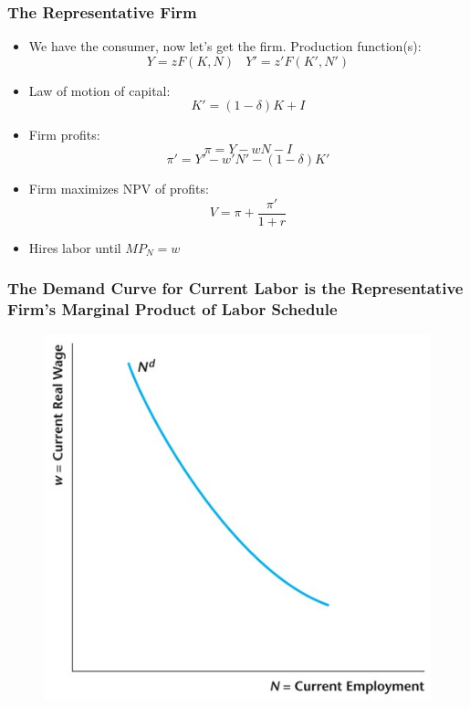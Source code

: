 \documentclass{beamer}
\begin{document}
\begin{frame}
\frametitle[alignment=center]{The Representative Firm}
\begin{itemize}
\item We have the consumer, now let's get the firm.  Production function(s):
$$Y=zF(K,N)\ \ \ \ Y'=z'F(K',N')$$
\item Law of motion of capital:
$$K'=(1-\delta)K+I$$
\item Firm profits:
$$\pi=Y-wN-I$$
$$\pi'=Y'-w'N'-(1-\delta)K'$$
\item Firm maximizes NPV of profits:
$$V=\pi+\frac{\pi'}{1+r}$$
\item Hires labor until $MP_N=w$
\end{itemize}
\end{frame}

\begin{frame}
\frametitle[alignment=center]{The Demand Curve for Current Labor is the Representative Firm's Marginal Product of Labor Schedule}
\begin{figure}
\centering
\includegraphics[scale=0.6]{Figures/W_Fig_11pt7.png}
\end{figure}
\end{frame}
\end{document}
